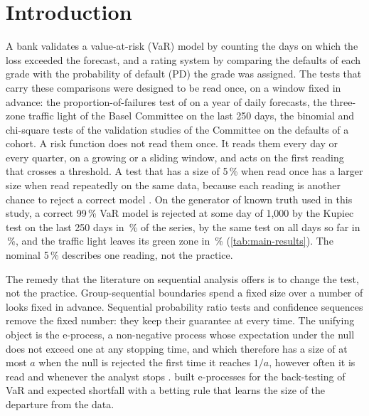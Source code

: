 \section{Introduction}
\label{sec:introduction}

A bank validates a value-at-risk (VaR) model by counting the days on which the loss exceeded the forecast, and a rating system by comparing the
defaults of each grade with the probability of default (PD) the grade was assigned. The tests that carry these comparisons were designed to be read
once, on a window fixed in advance: the proportion-of-failures test of \citet{kupiec1995} on a year of daily forecasts, the three-zone traffic light of the Basel
Committee \citep{bcbs1996,bcbs2019} on the last 250 days, the binomial and chi-square tests of the validation studies of the Committee \citep{bcbs2005,tasche2008}
on the defaults of a cohort. A risk function does not read them once. It reads them every day or every quarter, on a growing or a sliding window, and
acts on the first reading that crosses a threshold. A test that has a size of 5\,\% when read once has a larger size when read repeatedly on the same
data, because each reading is another chance to reject a correct model \citep{armitage1969}. On the generator of known truth used in this study, a correct 99\,\% VaR
model is rejected at some day of 1,000 by the Kupiec test on the last 250 days in \nNullSizeKupTrail\,\% of the series, by the same test on all days so far in
\nNullSizeKupCum\,\%, and the traffic light leaves its green zone in \nNullSizeLight\,\% (\cref{tab:main-results}). The nominal 5\,\% describes one reading,
not the practice.

The remedy that the literature on sequential analysis offers is to change the test, not the practice. Group-sequential boundaries \citep{pocock1977,obrien1979,lan1983}
spend a fixed size over a number of looks fixed in advance. Sequential probability ratio tests \citep{wald1945} and confidence sequences \citep{darling1967,howard2021} remove the
fixed number: they keep their guarantee at every time. The unifying object is the e-process, a non-negative process whose expectation under the null does not
exceed one at any stopping time, and which therefore has a size of at most $a$ when the null is rejected the first time it reaches $1/a$, however often it
is read and whenever the analyst stops \citep{shafer2011,shafer2021,ramdas2023,grunwald2024,vovk2021}. \citet{wang2022} built e-processes for the back-testing of VaR and expected shortfall
with a betting rule that learns the size of the departure from the data.

